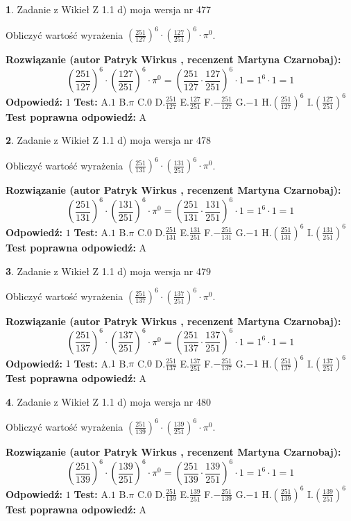 \documentclass[12pt, a4paper]{article}
\theoremstyle{definition} %
\newtheorem{zad}{}
\newcommand{\zadStart}[1]{\begin{zad}#1\newline}
\newcommand{\zadStop}{\end{zad}}
\newcommand{\rozwStart}[2]{\noindent \textbf{Rozwiązanie (autor #1 , recenzent #2): }\newline}
\newcommand{\rozwStop}{\newline}
\newcommand{\odpStart}{\noindent \textbf{Odpowiedź:}\newline}
\newcommand{\odpStop}{\newline}
\newcommand{\testStart}{\noindent \textbf{Test:}\newline}
\newcommand{\testStop}{\newline}
\newcommand{\kluczStart}{\noindent \textbf{Test poprawna odpowiedź:}\newline}
\newcommand{\kluczStop}{\newline}
\begin{document}
\zadStart{Zadanie z Wikieł Z 1.1 d) moja wersja nr 477}

Obliczyć wartość wyrażenia $(\frac{251}{127})^{6} \cdot (\frac{127}{251})^{6} \cdot \pi^{0}$.
\zadStop
\rozwStart{Patryk Wirkus}{Martyna Czarnobaj}
$$(\frac{251}{127})^{6} \cdot (\frac{127}{251})^{6} \cdot \pi^{0} = (\frac{251}{127} \cdot \frac{127}{251})^{6} \cdot 1 = 1^{6} \cdot 1 = 1$$
\rozwStop
\odpStart
$1$
\odpStop
\testStart
A.$1$ B.$\pi$ C.$0$ D.$\frac{251}{127}$ E.$\frac{127}{251}$
F.$-\frac{251}{127}$ G.$-1$
H.$(\frac{251}{127})^{6}$
I.$(\frac{127}{251})^{6}$
\testStop
\kluczStart
A
\kluczStop



\zadStart{Zadanie z Wikieł Z 1.1 d) moja wersja nr 478}

Obliczyć wartość wyrażenia $(\frac{251}{131})^{6} \cdot (\frac{131}{251})^{6} \cdot \pi^{0}$.
\zadStop
\rozwStart{Patryk Wirkus}{Martyna Czarnobaj}
$$(\frac{251}{131})^{6} \cdot (\frac{131}{251})^{6} \cdot \pi^{0} = (\frac{251}{131} \cdot \frac{131}{251})^{6} \cdot 1 = 1^{6} \cdot 1 = 1$$
\rozwStop
\odpStart
$1$
\odpStop
\testStart
A.$1$ B.$\pi$ C.$0$ D.$\frac{251}{131}$ E.$\frac{131}{251}$
F.$-\frac{251}{131}$ G.$-1$
H.$(\frac{251}{131})^{6}$
I.$(\frac{131}{251})^{6}$
\testStop
\kluczStart
A
\kluczStop



\zadStart{Zadanie z Wikieł Z 1.1 d) moja wersja nr 479}

Obliczyć wartość wyrażenia $(\frac{251}{137})^{6} \cdot (\frac{137}{251})^{6} \cdot \pi^{0}$.
\zadStop
\rozwStart{Patryk Wirkus}{Martyna Czarnobaj}
$$(\frac{251}{137})^{6} \cdot (\frac{137}{251})^{6} \cdot \pi^{0} = (\frac{251}{137} \cdot \frac{137}{251})^{6} \cdot 1 = 1^{6} \cdot 1 = 1$$
\rozwStop
\odpStart
$1$
\odpStop
\testStart
A.$1$ B.$\pi$ C.$0$ D.$\frac{251}{137}$ E.$\frac{137}{251}$
F.$-\frac{251}{137}$ G.$-1$
H.$(\frac{251}{137})^{6}$
I.$(\frac{137}{251})^{6}$
\testStop
\kluczStart
A
\kluczStop



\zadStart{Zadanie z Wikieł Z 1.1 d) moja wersja nr 480}

Obliczyć wartość wyrażenia $(\frac{251}{139})^{6} \cdot (\frac{139}{251})^{6} \cdot \pi^{0}$.
\zadStop
\rozwStart{Patryk Wirkus}{Martyna Czarnobaj}
$$(\frac{251}{139})^{6} \cdot (\frac{139}{251})^{6} \cdot \pi^{0} = (\frac{251}{139} \cdot \frac{139}{251})^{6} \cdot 1 = 1^{6} \cdot 1 = 1$$
\rozwStop
\odpStart
$1$
\odpStop
\testStart
A.$1$ B.$\pi$ C.$0$ D.$\frac{251}{139}$ E.$\frac{139}{251}$
F.$-\frac{251}{139}$ G.$-1$
H.$(\frac{251}{139})^{6}$
I.$(\frac{139}{251})^{6}$
\testStop
\kluczStart
A
\kluczStop
\end{document}
